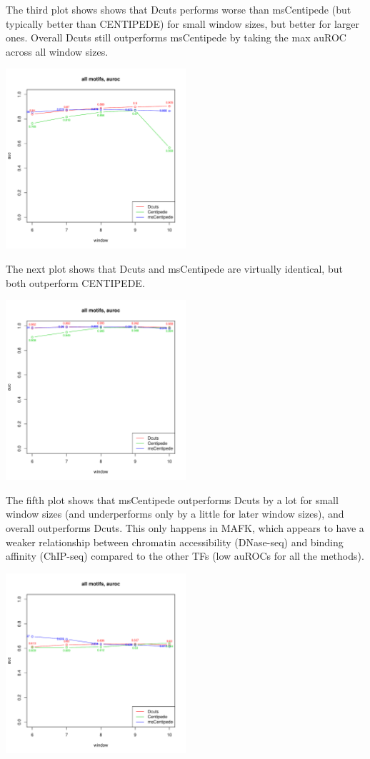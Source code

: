 \documentclass[12pt]{article}
\begin{document}
The third plot shows shows that Dcuts performs worse than msCentipede (but typically better than CENTIPEDE) for small window sizes, but better for larger ones. Overall Dcuts still outperforms msCentipede by taking the max auROC across all window sizes.
\begin{center}
\includegraphics[width=0.5\textwidth]{3_dcuts_mscent_cross.pdf}
\end{center}

The next plot shows that Dcuts and msCentipede are virtually identical, but both outperform CENTIPEDE.
\begin{center}
\includegraphics[width=0.5\textwidth]{4_dcuts_mscent_same.pdf}
\end{center}

The fifth plot shows that msCentipede outperforms Dcuts by a lot for small window sizes (and underperforms only by a little for later window sizes), and overall outperforms Dcuts. This only happens in MAFK, which appears to have a weaker relationship between chromatin accessibility (DNase-seq) and binding affinity (ChIP-seq) compared to the other TFs (low auROCs for all the methods).
\begin{center}
\includegraphics[width=0.5\textwidth]{5_mscent_better_small.pdf}
\end{center}
\end{document}
